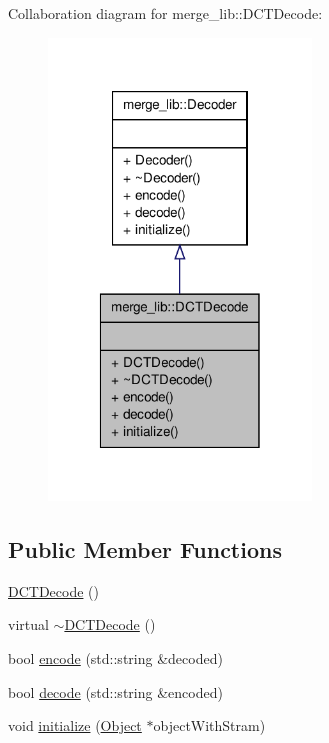 Collaboration diagram for merge\-\_\-lib\-:\-:D\-C\-T\-Decode\-:
\nopagebreak
\begin{figure}[H]
\begin{center}
\leavevmode
\includegraphics[width=198pt]{d4/dcc/classmerge__lib_1_1_d_c_t_decode__coll__graph}
\end{center}
\end{figure}
\subsection*{Public Member Functions}
\begin{DoxyCompactItemize}
\item 
\hyperlink{classmerge__lib_1_1_d_c_t_decode_a8f221a70ea6173f7e03e0e92fcdb613e}{D\-C\-T\-Decode} ()
\item 
virtual \hyperlink{classmerge__lib_1_1_d_c_t_decode_abcefdf54c9400c3dcac4ee9c7d82a751}{$\sim$\-D\-C\-T\-Decode} ()
\item 
bool \hyperlink{classmerge__lib_1_1_d_c_t_decode_a73ed6553783381c0d22e0331947392e9}{encode} (std\-::string \&decoded)
\item 
bool \hyperlink{classmerge__lib_1_1_d_c_t_decode_a9405f159419244ed14e9340273039bb9}{decode} (std\-::string \&encoded)
\item 
void \hyperlink{classmerge__lib_1_1_d_c_t_decode_aa7fad2b64da811967003c4d391be5887}{initialize} (\hyperlink{classmerge__lib_1_1_object}{Object} $\ast$object\-With\-Stram)
\end{DoxyCompactItemize}


